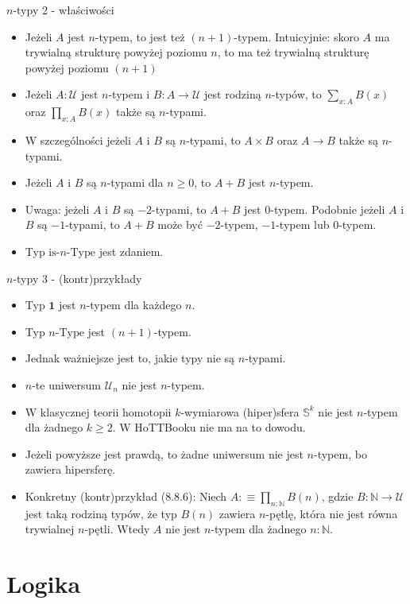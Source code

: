 \documentclass{beamer}
\newcommand{\defn}{:\equiv}
\newcommand{\U}{\mathcal{U}}
\begin{document}
\begin{frame}{$n$-typy 2 - właściwości}
\begin{itemize}
	\item Jeżeli $A$ jest $n$-typem, to jest też $(n + 1)$-typem. Intuicyjnie: skoro $A$ ma trywialną strukturę powyżej poziomu $n$, to ma też trywialną strukturę powyżej poziomu $(n + 1)$
	\item Jeżeli $A : \U$ jest $n$-typem i $B : A \to \U$ jest rodziną $n$-typów, to $\sum_{x : A} B(x)$ oraz $\prod_{x : A} B(x)$ także są $n$-typami.
	\item W szczególności jeżeli $A$ i $B$ są $n$-typami, to $A \times B$ oraz $A \to B$ także są $n$-typami.
	\item Jeżeli $A$ i $B$ są $n$-typami dla $n \geq 0$, to $A + B$ jest $n$-typem.
	\item Uwaga: jeżeli $A$ i $B$ są $-2$-typami, to $A + B$ jest $0$-typem. Podobnie jeżeli $A$ i $B$ są $-1$-typami, to $A + B$ może być $-2$-typem, $-1$-typem lub $0$-typem.
	\item Typ $\text{is-}n\text{-Type}$ jest zdaniem.
\end{itemize}
\end{frame}

\begin{frame}{$n$-typy 3 - (kontr)przykłady}
\begin{itemize}
	\item Typ $\textbf{1}$ jest $n$-typem dla każdego $n$.
	\item Typ $n\text{-Type}$ jest $(n + 1)$-typem.
	\item Jednak ważniejsze jest to, jakie typy nie są $n$-typami.
	\item $n$-te uniwersum $\U_n$ nie jest $n$-typem.
	\item W klasycznej teorii homotopii $k$-wymiarowa (hiper)sfera $\mathbb{S}^k$ nie jest $n$-typem dla żadnego $k \geq 2$. W HoTTBooku nie ma na to dowodu.
	\item Jeżeli powyższe jest prawdą, to żadne uniwersum nie jest $n$-typem, bo zawiera hipersferę.
	\item Konkretny (kontr)przykład (8.8.6): Niech $A \defn \prod_{n : \mathbb{N}} B(n)$, gdzie $B : \mathbb{N} \to \U$ jest taką rodziną typów, że typ $B(n)$ zawiera $n$-pętlę, która nie jest równa trywialnej $n$-pętli. Wtedy $A$ nie jest $n$-typem dla żadnego $n : \mathbb{N}$.
\end{itemize}
\end{frame}

\section{Logika}
\end{document}
